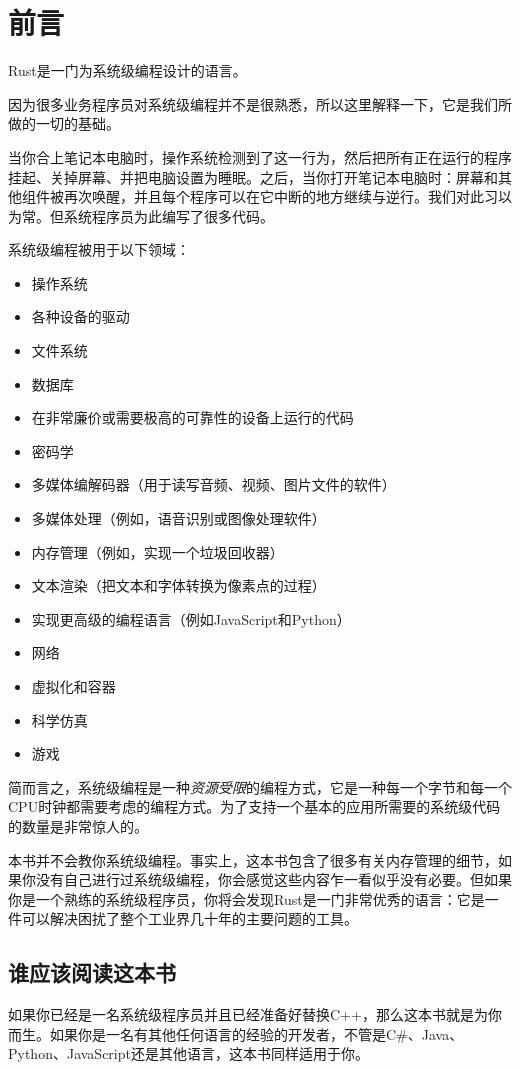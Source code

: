 \chapter{前言}
Rust是一门为系统级编程设计的语言。

因为很多业务程序员对系统级编程并不是很熟悉，所以这里解释一下，它是我们所做的一切的基础。

当你合上笔记本电脑时，操作系统检测到了这一行为，然后把所有正在运行的程序挂起、关掉屏幕、并把电脑设置为睡眠。之后，当你打开笔记本电脑时：屏幕和其他组件被再次唤醒，并且每个程序可以在它中断的地方继续与逆行。我们对此习以为常。但系统程序员为此编写了很多代码。

系统级编程被用于以下领域：
\begin{itemize}
    \item 操作系统
    \item 各种设备的驱动
    \item 文件系统
    \item 数据库
    \item 在非常廉价或需要极高的可靠性的设备上运行的代码
    \item 密码学
    \item 多媒体编解码器（用于读写音频、视频、图片文件的软件）
    \item 多媒体处理（例如，语音识别或图像处理软件）
    \item 内存管理（例如，实现一个垃圾回收器）
    \item 文本渲染（把文本和字体转换为像素点的过程）
    \item 实现更高级的编程语言（例如JavaScript和Python）
    \item 网络
    \item 虚拟化和容器
    \item 科学仿真
    \item 游戏
\end{itemize}

简而言之，系统级编程是一种\emph{资源受限}的编程方式，它是一种每一个字节和每一个CPU时钟都需要考虑的编程方式。为了支持一个基本的应用所需要的系统级代码的数量是非常惊人的。

本书并不会教你系统级编程。事实上，这本书包含了很多有关内存管理的细节，如果你没有自己进行过系统级编程，你会感觉这些内容乍一看似乎没有必要。但如果你是一个熟练的系统级程序员，你将会发现Rust是一门非常优秀的语言：它是一件可以解决困扰了整个工业界几十年的主要问题的工具。

\section*{谁应该阅读这本书}
如果你已经是一名系统级程序员并且已经准备好替换C++，那么这本书就是为你而生。如果你是一名有其他任何语言的经验的开发者，不管是C\#、Java、Python、JavaScript还是其他语言，这本书同样适用于你。

